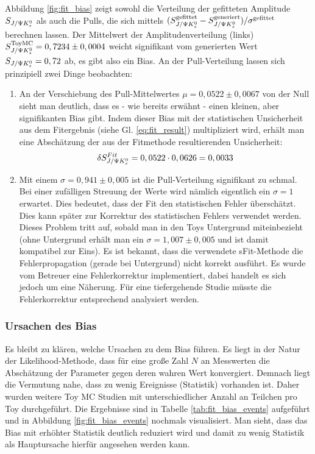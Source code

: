 Abbildung \ref{fig:fit_bias} zeigt sowohl die Verteilung der gefitteten Amplitude $S_{J/\Psi K_s^0}$ als auch die Pulls, die sich mittels $(S_{J/\Psi K_s^0}^{\text{gefittet}} - S_{J/\Psi K_s^0}^{\text{generiert}})/\sigma^{\text{gefittet}}$ berechnen lassen. Der Mittelwert der Amplitudenverteilung (links) $S_{J/\Psi K_s^0}^{\text{ToyMC}} = 0,7234 \pm 0,0004$ weicht signifikant vom generierten Wert $S_{J/\Psi K_s^0} = 0,72$ ab, es gibt also ein Bias. An der Pull-Verteilung lassen sich prinzipiell zwei Dinge beobachten:
\begin{enumerate}
    \item An der Verschiebung des Pull-Mittelwertes $\mu = 0,0522 \pm 0,0067$ von der Null sieht man deutlich, dass es - wie bereits erwähnt - einen kleinen, aber signifikanten Bias gibt. Indem dieser Bias mit der statistischen Unsicherheit aus dem Fitergebnis (siehe Gl. \ref{eq:fit_result}) multipliziert wird, erhält man eine Abschätzung der aus der Fitmethode resultierenden Unsicherheit:
        \begin{align}
        \delta S_{J/\Psi K_s^0}^{Fit} = 0,0522 \cdot 0,0626 = 0,0033
        \end{align}

    \item Mit einem $\sigma = 0,941 \pm 0,005$ ist die Pull-Verteilung signifikant zu schmal. Bei einer zufälligen Streuung der Werte wird nämlich eigentlich ein $\sigma=1$ erwartet. Dies bedeutet, dass der Fit den statistischen Fehler überschätzt. Dies kann später zur Korrektur des statistischen Fehlers verwendet werden. Dieses Problem tritt auf, sobald man in den Toys Untergrund miteinbezieht (ohne Untergrund erhält man ein $\sigma=1,007\pm 0,005$ und ist damit kompatibel zur Eins). Es ist bekannt, dass die verwendete sFit-Methode die Fehlerpropagation (gerade bei Untergrund) nicht korrekt ausführt. Es wurde vom Betreuer eine Fehlerkorrektur implementiert, dabei handelt es sich jedoch um eine Näherung. Für eine tiefergehende Studie müsste die Fehlerkorrektur entsprechend analysiert werden.
\end{enumerate}

\subsubsection{Ursachen des Bias}
Es bleibt zu klären, welche Ursachen zu dem Bias führen. Es liegt in der Natur der Likelihood-Methode, dass für eine große Zahl $N$ an Messwerten die Abschätzung der Parameter gegen deren wahren Wert konvergiert. Demnach liegt die Vermutung nahe, dass zu wenig Ereignisse (\glqq Statistik\grqq) vorhanden ist. Daher wurden weitere Toy MC Studien mit unterschiedlicher Anzahl an Teilchen pro Toy durchgeführt. Die Ergebnisse sind in Tabelle \ref{tab:fit_bias_events} aufgeführt und in Abbildung \ref{fig:fit_bias_events} nochmals visualisiert. Man sieht, dass das Bias mit erhöhter Statistik deutlich reduziert wird und damit zu wenig Statistik als Hauptursache hierfür angesehen werden kann.

